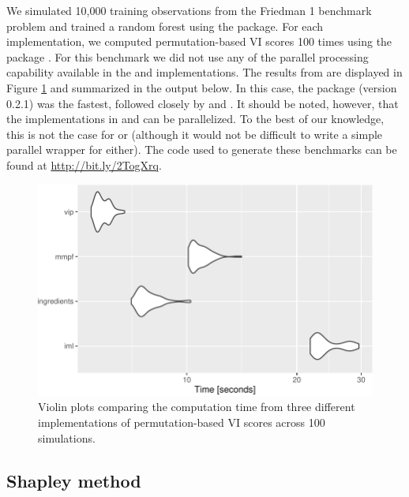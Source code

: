 We simulated 10,000 training observations from the Friedman 1 benchmark
problem and trained a random forest using the  package. For
each implementation, we computed permutation-based VI scores 100 times
using the  package \citep{R-microbenchmark}. For
this benchmark we did not use any of the parallel processing capability
available in the  and  implementations. The results
from  are displayed in Figure \ref{fig:benchmark}
and summarized in the output below. In this case, the  package
(version 0.2.1) was the fastest, followed closely by 
and . It should be noted, however, that the implementations in
 and  can be parallelized. To the best of our
knowledge, this is not the case for  or 
(although it would not be difficult to write a simple parallel wrapper
for either). The code used to generate these benchmarks can be found at
\url{http://bit.ly/2TogXrq}.

\begin{Schunk}
\begin{figure}[!htb]

{\centering \includegraphics[width=0.7\linewidth]{greenwell-boehmke_files/figure-latex/benchmark-1}

}

\caption[Violin plots comparing the computation time from three different implementations of permutation-based VI scores across 100 simulations]{Violin plots comparing the computation time from three different implementations of permutation-based VI scores across 100 simulations.}\label{fig:benchmark}
\end{figure}
\end{Schunk}

\subsection{Shapley method}

